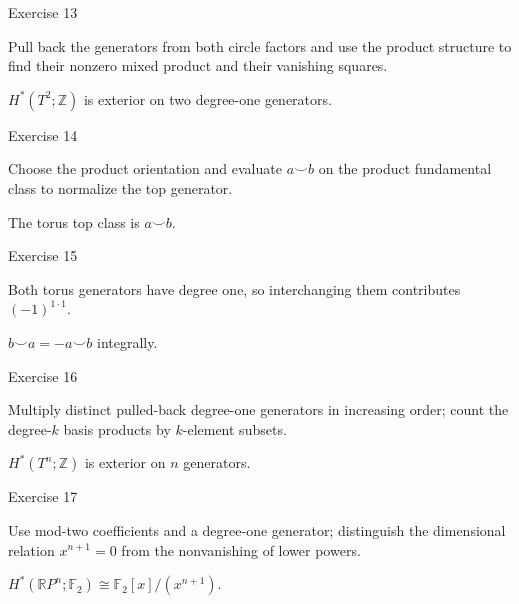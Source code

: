 \begin{exercise}\label{exr:viii29-13}
Exercise 13
\end{exercise}
\begin{hint}
Pull back the generators from both circle factors and use the product structure to find their nonzero mixed product and their vanishing squares.
\end{hint}
\begin{solution}
\(H^*(T^2;\mathbb Z)\) is exterior on two degree-one generators.
\end{solution}

\begin{exercise}\label{exr:viii29-14}
Exercise 14
\end{exercise}
\begin{hint}
Choose the product orientation and evaluate \(a\smile b\) on the product fundamental class to normalize the top generator.
\end{hint}
\begin{solution}
The torus top class is \(a\smile b\).
\end{solution}

\begin{exercise}\label{exr:viii29-15}
Exercise 15
\end{exercise}
\begin{hint}
Both torus generators have degree one, so interchanging them contributes \((-1)^{1\cdot1}\).
\end{hint}
\begin{solution}
\(b\smile a=-a\smile b\) integrally.
\end{solution}

\begin{exercise}\label{exr:viii29-16}
Exercise 16
\end{exercise}
\begin{hint}
Multiply distinct pulled-back degree-one generators in increasing order; count the degree-\(k\) basis products by \(k\)-element subsets.
\end{hint}
\begin{solution}
\(H^*(T^n;\mathbb Z)\) is exterior on \(n\) generators.
\end{solution}

\begin{exercise}\label{exr:viii29-17}
Exercise 17
\end{exercise}
\begin{hint}
Use mod-two coefficients and a degree-one generator; distinguish the dimensional relation \(x^{n+1}=0\) from the nonvanishing of lower powers.
\end{hint}
\begin{solution}
\(H^*(\mathbb RP^n;\mathbb F_2)\cong\mathbb F_2[x]/(x^{n+1})\).
\end{solution}

